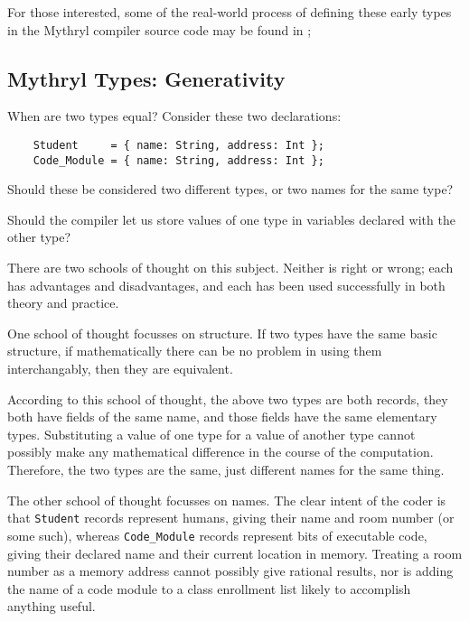 For those interested, some of the real-world process of defining these 
early types in the Mythryl compiler source code may be found in 
;

\cutend*

\subsection{Mythryl Types:  Generativity}

When are two types equal?  Consider these two declarations:

\begin{verbatim}
    Student     = { name: String, address: Int };
    Code_Module = { name: String, address: Int };
\end{verbatim}

Should these be considered two different types, or two names for 
the same type?

Should the compiler let us store values of one type in variables 
declared with the other type?

There are two schools of thought on this subject.  Neither is 
right or wrong;  each has advantages and disadvantages, and 
each has been used successfully in both theory and 
practice.

One school of thought focusses on structure.  If two types have 
the same basic structure, if mathematically there can be no problem 
in using them interchangably, then they are equivalent.

According to this school of thought, the above two types are both 
records, they both have fields of the same name, and those fields 
have the same elementary types.  Substituting a value of one type 
for a value of another type cannot possibly make any mathematical 
difference in the course of the computation.  Therefore, the two 
types are the same, just different names for the same thing.

The other school of thought focusses on names.  The clear intent 
of the coder is that {\tt Student} records represent humans, giving their 
name and room number (or some such), whereas {\tt Code\_Module} 
records represent bits of executable code, giving their declared 
name and their current location in memory.  Treating a room number 
as a memory address cannot possibly give rational results, nor is 
adding the name of a code module to a class enrollment list likely 
to accomplish anything useful.

